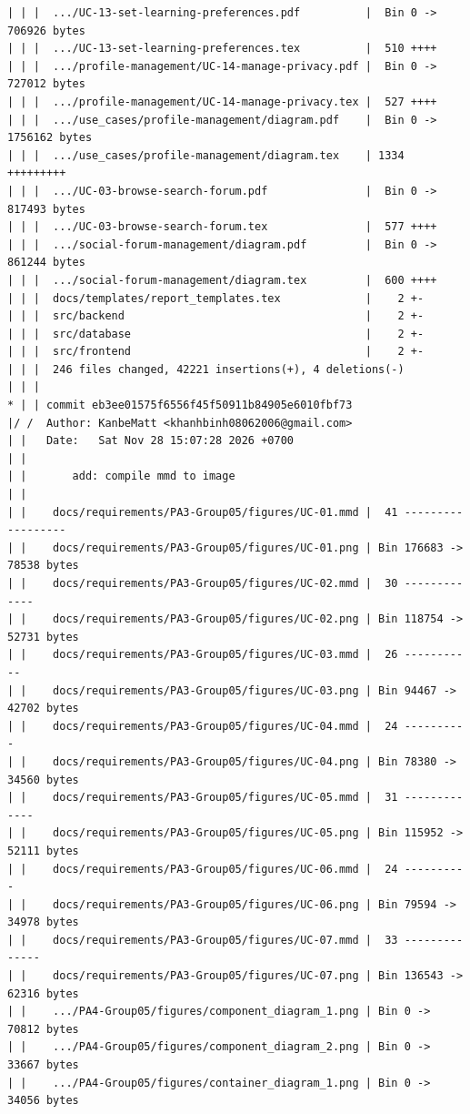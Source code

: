 \documentclass[12pt]{article}
\begin{document}
\begin{lstlisting}[numbers=none,breaklines=true]
| | |  .../UC-13-set-learning-preferences.pdf          |  Bin 0 -> 706926 bytes
| | |  .../UC-13-set-learning-preferences.tex          |  510 ++++
| | |  .../profile-management/UC-14-manage-privacy.pdf |  Bin 0 -> 727012 bytes
| | |  .../profile-management/UC-14-manage-privacy.tex |  527 ++++
| | |  .../use_cases/profile-management/diagram.pdf    |  Bin 0 -> 1756162 bytes
| | |  .../use_cases/profile-management/diagram.tex    | 1334 +++++++++
| | |  .../UC-03-browse-search-forum.pdf               |  Bin 0 -> 817493 bytes
| | |  .../UC-03-browse-search-forum.tex               |  577 ++++
| | |  .../social-forum-management/diagram.pdf         |  Bin 0 -> 861244 bytes
| | |  .../social-forum-management/diagram.tex         |  600 ++++
| | |  docs/templates/report_templates.tex             |    2 +-
| | |  src/backend                                     |    2 +-
| | |  src/database                                    |    2 +-
| | |  src/frontend                                    |    2 +-
| | |  246 files changed, 42221 insertions(+), 4 deletions(-)
| | |
* | | commit eb3ee01575f6556f45f50911b84905e6010fbf73
|/ /  Author: KanbeMatt <khanhbinh08062006@gmail.com>
| |   Date:   Sat Nov 28 15:07:28 2026 +0700
| |
| |       add: compile mmd to image
| |
| |    docs/requirements/PA3-Group05/figures/UC-01.mmd |  41 ------------------
| |    docs/requirements/PA3-Group05/figures/UC-01.png | Bin 176683 -> 78538 bytes
| |    docs/requirements/PA3-Group05/figures/UC-02.mmd |  30 -------------
| |    docs/requirements/PA3-Group05/figures/UC-02.png | Bin 118754 -> 52731 bytes
| |    docs/requirements/PA3-Group05/figures/UC-03.mmd |  26 -----------
| |    docs/requirements/PA3-Group05/figures/UC-03.png | Bin 94467 -> 42702 bytes
| |    docs/requirements/PA3-Group05/figures/UC-04.mmd |  24 ----------
| |    docs/requirements/PA3-Group05/figures/UC-04.png | Bin 78380 -> 34560 bytes
| |    docs/requirements/PA3-Group05/figures/UC-05.mmd |  31 -------------
| |    docs/requirements/PA3-Group05/figures/UC-05.png | Bin 115952 -> 52111 bytes
| |    docs/requirements/PA3-Group05/figures/UC-06.mmd |  24 ----------
| |    docs/requirements/PA3-Group05/figures/UC-06.png | Bin 79594 -> 34978 bytes
| |    docs/requirements/PA3-Group05/figures/UC-07.mmd |  33 --------------
| |    docs/requirements/PA3-Group05/figures/UC-07.png | Bin 136543 -> 62316 bytes
| |    .../PA4-Group05/figures/component_diagram_1.png | Bin 0 -> 70812 bytes
| |    .../PA4-Group05/figures/component_diagram_2.png | Bin 0 -> 33667 bytes
| |    .../PA4-Group05/figures/container_diagram_1.png | Bin 0 -> 34056 bytes

\end{lstlisting}
\end{document}
